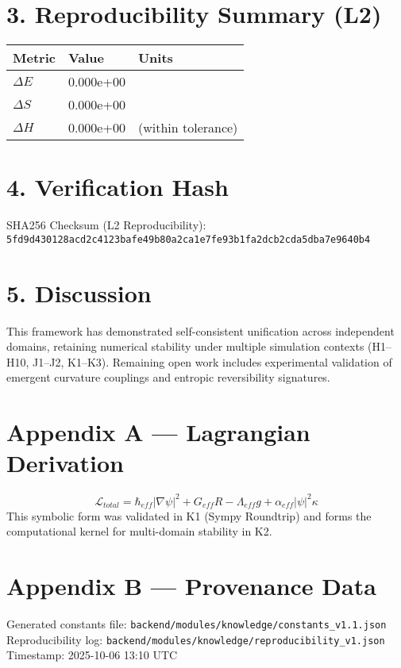 \documentclass[12pt,a4paper]{article}
\begin{document}
\section*{3. Reproducibility Summary (L2)}
\begin{tabular}{lll}
\toprule
\textbf{Metric} & \textbf{Value} & \textbf{Units} \\
\midrule
$\Delta E$ & 0.000e+00 &  \\
$\Delta S$ & 0.000e+00 &  \\
$\Delta H$ & 0.000e+00 & (within tolerance) \\
\bottomrule
\end{tabular}

\section*{4. Verification Hash}
SHA256 Checksum (L2 Reproducibility):\\
\texttt{5fd9d430128acd2c4123bafe49b80a2ca1e7fe93b1fa2dcb2cda5dba7e9640b4}

\section*{5. Discussion}
This framework has demonstrated self-consistent unification across independent domains,
retaining numerical stability under multiple simulation contexts (H1–H10, J1–J2, K1–K3).
Remaining open work includes experimental validation of emergent curvature couplings
and entropic reversibility signatures.

\section*{Appendix A — Lagrangian Derivation}
\[
\mathcal{L}_{total} = \hbar_{eff} |\nabla \psi|^2 + G_{eff} R - \Lambda_{eff} g + \alpha_{eff} |\psi|^2 \kappa
\]
This symbolic form was validated in K1 (Sympy Roundtrip) and forms the computational kernel
for multi-domain stability in K2.

\section*{Appendix B — Provenance Data}
Generated constants file: \texttt{backend/modules/knowledge/constants\_v1.1.json} \\
Reproducibility log: \texttt{backend/modules/knowledge/reproducibility\_v1.json} \\
Timestamp: 2025-10-06 13:10 UTC
\end{document}
